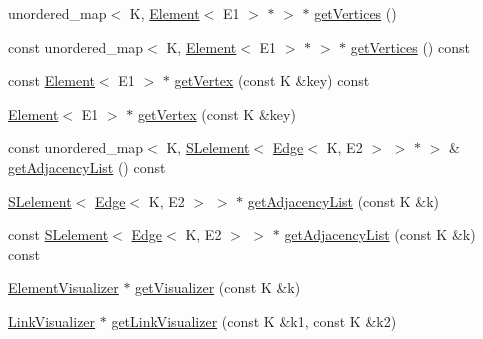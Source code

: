 \begin{DoxyCompactItemize}
unordered\+\_\+map$<$ K, \mbox{\hyperlink{classbridges_1_1datastructure_1_1_element}{Element}}$<$ E1 $>$ $\ast$ $>$ $\ast$ \mbox{\hyperlink{classbridges_1_1datastructure_1_1_graph_adj_list_af91334de325f4be241c3c939ea9c5a36}{get\+Vertices}} ()
\item 
const unordered\+\_\+map$<$ K, \mbox{\hyperlink{classbridges_1_1datastructure_1_1_element}{Element}}$<$ E1 $>$ $\ast$ $>$ $\ast$ \mbox{\hyperlink{classbridges_1_1datastructure_1_1_graph_adj_list_a77b21cfdb87c4cf45ce29be6e7dd9791}{get\+Vertices}} () const
\item 
const \mbox{\hyperlink{classbridges_1_1datastructure_1_1_element}{Element}}$<$ E1 $>$ $\ast$ \mbox{\hyperlink{classbridges_1_1datastructure_1_1_graph_adj_list_ada58af550495cee2fe454c0be0f8504e}{get\+Vertex}} (const K \&key) const
\item 
\mbox{\hyperlink{classbridges_1_1datastructure_1_1_element}{Element}}$<$ E1 $>$ $\ast$ \mbox{\hyperlink{classbridges_1_1datastructure_1_1_graph_adj_list_aa55482a035e233299d49874732113e6d}{get\+Vertex}} (const K \&key)
\item 
const unordered\+\_\+map$<$ K, \mbox{\hyperlink{classbridges_1_1datastructure_1_1_s_lelement}{S\+Lelement}}$<$ \mbox{\hyperlink{classbridges_1_1datastructure_1_1_edge}{Edge}}$<$ K, E2 $>$ $>$ $\ast$ $>$ \& \mbox{\hyperlink{classbridges_1_1datastructure_1_1_graph_adj_list_a23dad50371f073dd9a2f48e83720e86c}{get\+Adjacency\+List}} () const
\item 
\mbox{\hyperlink{classbridges_1_1datastructure_1_1_s_lelement}{S\+Lelement}}$<$ \mbox{\hyperlink{classbridges_1_1datastructure_1_1_edge}{Edge}}$<$ K, E2 $>$ $>$ $\ast$ \mbox{\hyperlink{classbridges_1_1datastructure_1_1_graph_adj_list_aa3df7d161ed7847a188b5818f78818d8}{get\+Adjacency\+List}} (const K \&k)
\item 
const \mbox{\hyperlink{classbridges_1_1datastructure_1_1_s_lelement}{S\+Lelement}}$<$ \mbox{\hyperlink{classbridges_1_1datastructure_1_1_edge}{Edge}}$<$ K, E2 $>$ $>$ $\ast$ \mbox{\hyperlink{classbridges_1_1datastructure_1_1_graph_adj_list_a1f8ea98a84017aa4bf6058475c0b3ed0}{get\+Adjacency\+List}} (const K \&k) const
\item 
\mbox{\hyperlink{classbridges_1_1datastructure_1_1_element_visualizer}{Element\+Visualizer}} $\ast$ \mbox{\hyperlink{classbridges_1_1datastructure_1_1_graph_adj_list_a097e4678b1273c29b1ac63319b4535e5}{get\+Visualizer}} (const K \&k)
\item 
\mbox{\hyperlink{classbridges_1_1datastructure_1_1_link_visualizer}{Link\+Visualizer}} $\ast$ \mbox{\hyperlink{classbridges_1_1datastructure_1_1_graph_adj_list_ae36ba10fae403339df0c36707ed13536}{get\+Link\+Visualizer}} (const K \&k1, const K \&k2)

\end{DoxyCompactItemize}
